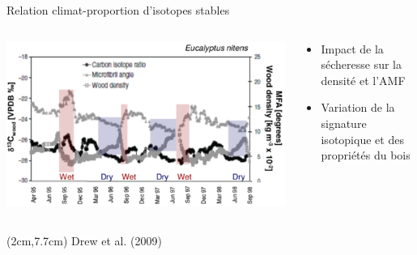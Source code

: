 \documentclass{beamer}
\begin{document}
\begin{frame}{Relation climat-proportion d'isotopes stables}
	
\begin{columns}
	
	\begin{column}{0.6\textwidth}
		\includegraphics[width=\textwidth]{ctreizeDrew2009}
	\end{column}
		
	\begin{column}{0.4\textwidth}
		\begin{itemize} 
			\item Impact de la sécheresse sur la densité et l'AMF\\
			\vspace{0.5cm}
			\item Variation de la signature isotopique et des propriétés du bois\\
		\end{itemize}		
	\end{column}

\end{columns}
	\begin{textblock*}{10cm}(2cm,7.7cm)
		\tiny Drew et al. (2009)	
	\end{textblock*}
	
\end{frame}

\end{document}
